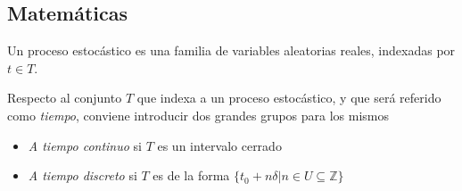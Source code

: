 
\subsection{Matem\'aticas}







\begin{defn}
Un proceso estoc\'astico \xt es una familia de variables aleatorias reales, 
indexadas por $t \in T$.
\label{proc_estocastico}
\end{defn}

Respecto al conjunto $T$ que indexa a un proceso estoc\'astico, y que ser\'a referido como 
\textit{tiempo}, conviene introducir dos grandes grupos para los mismos
\begin{itemize}
\item \textit{A tiempo continuo} si $T$ es un intervalo cerrado
\item \textit{A tiempo discreto} si $T$ es de la forma 
$\{ t_0 + n \delta \lvert n \in U \subseteq \mathbb{Z} \}$
\end{itemize}

